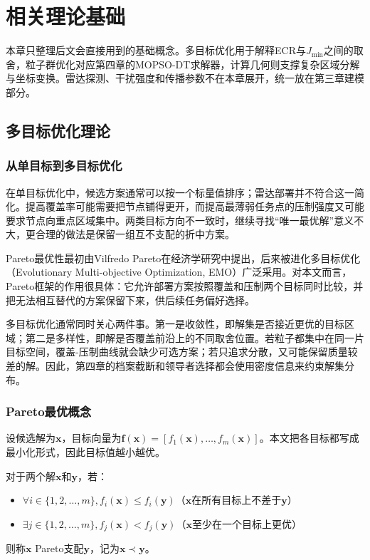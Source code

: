 \chapter{相关理论基础}\label{chap:related}\label{chap:theory}

本章只整理后文会直接用到的基础概念。多目标优化用于解释ECR与$J_{\min}$之间的取舍，粒子群优化对应第四章的MOPSO-DT求解器，计算几何则支撑复杂区域分解与坐标变换。雷达探测、干扰强度和传播参数不在本章展开，统一放在第三章建模部分。

\section{多目标优化理论}

\subsection{从单目标到多目标优化}

在单目标优化中，候选方案通常可以按一个标量值排序；雷达部署并不符合这一简化。提高覆盖率可能需要把节点铺得更开，而提高最薄弱任务点的压制强度又可能要求节点向重点区域集中。两类目标方向不一致时，继续寻找“唯一最优解”意义不大，更合理的做法是保留一组互不支配的折中方案。

Pareto最优性最初由Vilfredo Pareto在经济学研究中提出，后来被进化多目标优化（Evolutionary Multi-objective Optimization, EMO）广泛采用。对本文而言，Pareto框架的作用很具体：它允许部署方案按照覆盖和压制两个目标同时比较，并把无法相互替代的方案保留下来，供后续任务偏好选择。

多目标优化通常同时关心两件事。第一是收敛性，即解集是否接近更优的目标区域；第二是多样性，即解是否覆盖前沿上的不同取舍位置。若粒子都集中在同一片目标空间，覆盖-压制曲线就会缺少可选方案；若只追求分散，又可能保留质量较差的解。因此，第四章的档案截断和领导者选择都会使用密度信息来约束解集分布。

\subsection{Pareto最优概念}

设候选解为$\mathbf{x}$，目标向量为$\mathbf{f}(\mathbf{x})=[f_1(\mathbf{x}),\ldots,f_m(\mathbf{x})]$。本文把各目标都写成最小化形式，因此目标值越小越优。

\begin{definition}[Pareto支配]
对于两个解$\mathbf{x}$和$\mathbf{y}$，若：
\begin{itemize}
    \item $\forall i \in \{1,2,\ldots,m\}, f_i(\mathbf{x}) \leq f_i(\mathbf{y})$（$\mathbf{x}$在所有目标上不差于$\mathbf{y}$）
    \item $\exists j \in \{1,2,\ldots,m\}, f_j(\mathbf{x}) < f_j(\mathbf{y})$（$\mathbf{x}$至少在一个目标上更优）
\end{itemize}
则称$\mathbf{x}$ Pareto支配$\mathbf{y}$，记为$\mathbf{x} \prec \mathbf{y}$。
\end{definition}

